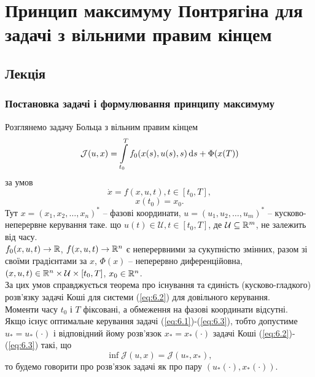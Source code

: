 \setcounter{section}{6}


\section{Принцип максимуму Понтрягіна для задачі з вільними правим кінцем}

\subsection{Лекція}

\subsubsection{Постановка задачі і формулювання принципу максимуму}

Розглянемо задачу Больца з вільним правим кінцем
\begin{equation}
    \label{eq:6.1}
    \mathcal{J}(u, x) = \displaystyle\int\limits_{t_0}^T f_0 (x(s), u(s), s) \, \mathrm{d} s + \Phi(x(T))
\end{equation}
за умов
\begin{equation}
    \label{eq:6.2}
    \dot x = f(x, u, t), t \in [t_0, T],
\end{equation}
\begin{equation}
    \label{eq:6.3}
    x(t_0) = x_0.
\end{equation}
Тут $x = (x_1, x_2, \ldots, x_n)^*$ -- фазові координати, $u = (u_1, u_2, \ldots, u_m)^*$ -- кусково-неперервне керування таке. що $u(t) \in \mathcal{U}, t \in [t_0, T]$, де $\mathcal{U} \subseteq \mathbb{R}^m$, не залежить від часу. \\

$f_0(x, u, t) \to \mathbb{R}$, $f(x, u, t) \to \mathbb{R}^n$ є неперервними за сукупністю змінних, разом зі своїми градієнтами за $x$, $\Phi(x)$ -- неперервно диференційовна, $(x, u, t) \in \mathbb{R}^n \times \mathcal{U} \times [t_0, T]$, $x_0 \in \mathbb{R}^n$. \\

За цих умов справджується теорема про існування та єдиність (кусково-гладкого) розв'язку задачі Коші для системи (\ref{eq:6.2}) для довільного керування. \\

Моменти часу $t_0$ і $T$ фіксовані, а обмеження на фазові координати відсутні. \\

Якщо існує оптимальне керування задачі (\ref{eq:6.1})-(\ref{eq:6.3}), тобто допустиме $u_* = u_*(\cdot)$ і відповідний йому розв'язок $x_* = x_*(\cdot)$ задачі Коші (\ref{eq:6.2})-(\ref{eq:6.3}) такі, що
\begin{equation*}
    \inf \mathcal{J}(u, x) = \mathcal{J}(u_*, x_*),
\end{equation*}
то будемо говорити про розв'язок задачі як про пару $(u_*(\cdot), x_*(\cdot))$. \\


